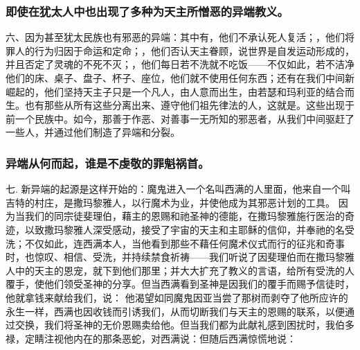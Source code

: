\subsubsection{即使在犹太人中也出现了多种为天主所憎恶的异端教义。}

六、因为甚至犹太民族也有邪恶的异端：其中有，他们不承认死人复活；，他们将罪人的行为归因于命运和定命；，他们否认天主眷顾，说世界是自发运动形成的，并且否定了灵魂的不死不灭；，他们每日若不洗就不吃饭——不仅如此，若不洁净他们的床、桌子、盘子、杯子、座位，他们就不使用任何东西；还有在我们中间新崛起的，他们坚持天主子只是一个凡人，由人意而出生，由若瑟和玛利亚的结合而生。也有那些从所有这些分离出来、遵守他们祖先律法的人，这就是。这些出现于前一个民族中。如今，那善于作恶、对善事一无所知的邪恶者，从我们中间驱赶了一些人，并通过他们制造了异端和分裂。\par


\subsubsection{异端从何而起，谁是不虔敬的罪魁祸首。}

七. 新异端的起源是这样开始的：魔鬼进入一个名叫西满的人里面，他来自一个叫吉特的村庄，是撒玛黎雅人，以行魔术为业，并使他成为其邪恶计划的工具。 因为当我们的同宗徒斐理伯，藉主的恩赐和祂圣神的德能，在撒玛黎雅施行医治的奇迹，以致撒玛黎雅人深受感动，接受了宇宙的天主和主耶稣的信仰，并奉祂的名受洗；不仅如此，连西满本人，当他看到那些不藉任何魔术仪式而行的征兆和奇事时，也惊叹、相信、受洗，并持续禁食祈祷——我们听说了因斐理伯而在撒玛黎雅人中的天主的恩宠，就下到他们那里；并大大扩充了教义的言语，给所有受洗的人覆手，使他们领受圣神的分享。但当西满看到圣神是因我们的覆手而赐予信徒时，他就拿钱来献给我们，说： 他渴望如同魔鬼因亚当尝了那树而剥夺了他所应许的永生一样，西满也因收钱而引诱我们，从而切断我们与天主的恩赐的联系，以便通过交换，我们将圣神的无价恩赐卖给他。但当我们都为此献礼感到困扰时，我伯多禄，定睛注视他内在的那条恶蛇，对西满说：但随后西满惊慌地说：\par

